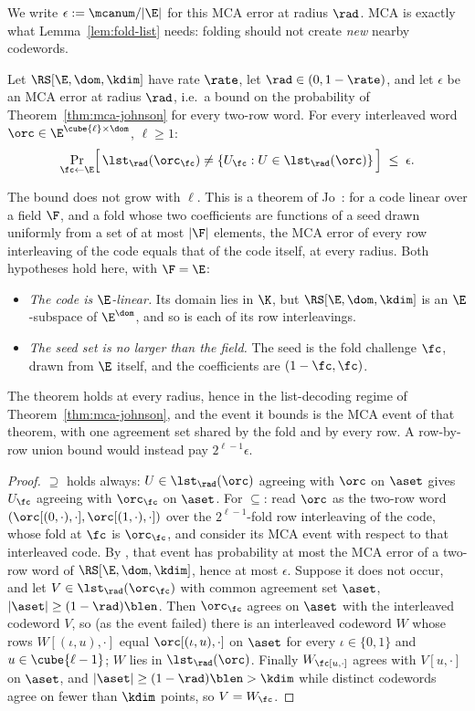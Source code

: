 We write $\epsilon := \mcanum/|\E|$ for this MCA error at radius $\rad$. MCA is exactly what Lemma~\ref{lem:fold-list} needs: folding should not create \emph{new} nearby codewords.

\begin{lemma}\label{lem:fold-list}
Let $\RS[\E,\dom,\kdim]$ have rate $\rate$, let $\rad \in (0, 1-\rate)$, and let $\epsilon$ be an MCA error at radius $\rad$, i.e.\ a bound on the probability of Theorem~\ref{thm:mca-johnson} for every two-row word. For every interleaved word $\orc \in \E^{\cube{\ell} \times \dom}$, $\ell \ge 1$:
\[
\Pr_{\fc \leftarrow \E}\Bigl[\, \lst_\rad(\orc_\fc) \neq \{ U_\fc : U \in \lst_\rad(\orc) \} \,\Bigr] \;\le\; \epsilon .
\]
\end{lemma}

The bound does not grow with $\ell$. This is a theorem of Jo~\cite[Thm.~4.4]{Jo26}: for a code linear over a field $\F$, and a fold whose two coefficients are functions of a seed drawn uniformly from a set of at most $|\F|$ elements, the MCA error of every row interleaving of the code equals that of the code itself, at every radius. Both hypotheses hold here, with $\F = \E$:
\begin{itemize}[itemsep=1pt]
\item \emph{The code is $\E$-linear.} Its domain lies in $\K$, but $\RS[\E,\dom,\kdim]$ is an $\E$-subspace of $\E^\dom$, and so is each of its row interleavings.
\item \emph{The seed set is no larger than the field.} The seed is the fold challenge $\fc$, drawn from $\E$ itself, and the coefficients are $(1-\fc, \fc)$.
\end{itemize}
The theorem holds at every radius, hence in the list-decoding regime of Theorem~\ref{thm:mca-johnson}, and the event it bounds is the MCA event of that theorem, with one agreement set shared by the fold and by every row. A row-by-row union bound would instead pay $2^{\ell-1}\epsilon$.

\begin{proof}
$\supseteq$ holds always: $U \in \lst_\rad(\orc)$ agreeing with $\orc$ on $\aset$ gives $U_\fc$ agreeing with $\orc_\fc$ on $\aset$. For $\subseteq$: read $\orc$ as the two-row word $(\orc[(0,\cdot),\cdot], \orc[(1,\cdot),\cdot])$ over the $2^{\ell-1}$-fold row interleaving of the code, whose fold at $\fc$ is $\orc_\fc$, and consider its MCA event with respect to that interleaved code. By \cite[Thm.~4.4]{Jo26}, that event has probability at most the MCA error of a two-row word of $\RS[\E,\dom,\kdim]$, hence at most $\epsilon$. Suppose it does not occur, and let $V \in \lst_\rad(\orc_\fc)$ with common agreement set $\aset$, $|\aset| \ge (1-\rad)\blen$. Then $\orc_\fc$ agrees on $\aset$ with the interleaved codeword $V$, so (as the event failed) there is an interleaved codeword $W$ whose rows $W[(\iota,u),\cdot]$ equal $\orc[(\iota,u),\cdot]$ on $\aset$ for every $\iota \in \{0,1\}$ and $u \in \cube{\ell-1}$; $W$ lies in $\lst_\rad(\orc)$. Finally $W_\fc[u,\cdot]$ agrees with $V[u,\cdot]$ on $\aset$, and $|\aset| \ge (1-\rad)\blen > \kdim$ while distinct codewords agree on fewer than $\kdim$ points, so $V = W_\fc$.
\end{proof}

